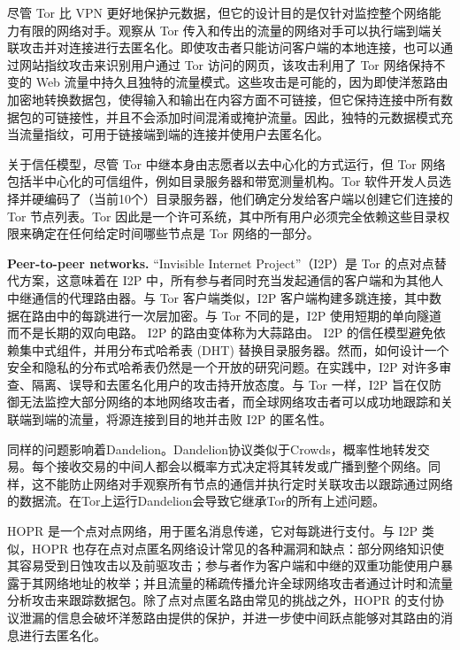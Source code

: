 \documentclass{article}
\begin{document}
	尽管 Tor 比 VPN 更好地保护元数据，但它的设计目的是仅针对监控整个网络能力有限的网络对手。观察从 Tor 传入和传出的流量的网络对手可以执行端到端关联攻击并对连接进行去匿名化\cite{ref62, ref71, ref83, ref96, ref97}。即使攻击者只能访问客户端的本地连接，也可以通过网站指纹攻击来识别用户通过 Tor 访问的网页，该攻击利用了 Tor 网络保持不变的 Web 流量中持久且独特的流量模式\cite{ref63, ref84}。这些攻击是可能的，因为即使洋葱路由加密地转换数据包，使得输入和输出在内容方面不可链接，但它保持连接中所有数据包的可链接性，并且不会添加时间混淆或掩护流量。因此，独特的元数据模式充当流量指纹，可用于链接端到端的连接并使用户去匿名化。\newline

	关于信任模型，尽管 Tor 中继本身由志愿者以去中心化的方式运行，但 Tor 网络包括半中心化的可信组件，例如目录服务器和带宽测量机构。Tor 软件开发人员选择并硬编码了（当前10个）目录服务器，他们确定分发给客户端以创建它们连接的 Tor 节点列表。Tor 因此是一个许可系统，其中所有用户必须完全依赖这些目录权限来确定在任何给定时间哪些节点是 Tor 网络的一部分。\newline

	\textbf{Peer-to-peer networks.} “Invisible Internet Project”（I2P）是 Tor 的点对点替代方案，这意味着在 I2P 中，所有参与者同时充当发起通信的客户端和为其他人中继通信的代理路由器\cite{ref58}。与 Tor 客户端类似，I2P 客户端构建多跳连接，其中数据在路由中的每跳进行一次层加密。与 Tor 不同的是，I2P 使用短期的单向隧道而不是长期的双向电路。 I2P 的路由变体称为大蒜路由。 I2P 的信任模型避免依赖集中式组件，并用分布式哈希表 (DHT) 替换目录服务器。然而，如何设计一个安全和隐私的分布式哈希表仍然是一个开放的研究问题\cite{ref102}。在实践中，I2P 对许多审查、隔离、误导和去匿名化用户的攻击持开放态度\cite{ref45, ref54, ref55, ref61}。与 Tor 一样，I2P 旨在仅防御无法监控大部分网络的本地网络攻击者，而全球网络攻击者可以成功地跟踪和关联端到端的流量，将源连接到目的地并击败 I2P 的匿名性。\newline

	同样的问题影响着Dandelion\cite{ref8}。Dandelion协议类似于Crowds\cite{ref90}，概率性地转发交易。每个接收交易的中间人都会以概率方式决定将其转发或广播到整个网络。同样，这不能防止网络对手观察所有节点的通信并执行定时关联攻击以跟踪通过网络的数据流。在Tor上运行Dandelion会导致它继承Tor的所有上述问题\cite{ref46}。\newline

	HOPR 是一个点对点网络，用于匿名消息传递，它对每跳进行支付\cite{ref56}。与 I2P 类似，HOPR 也存在点对点匿名网络设计常见的各种漏洞和缺点：部分网络知识使其容易受到日蚀攻击\cite{ref99, ref100}以及前驱攻击\cite{ref104}；参与者作为客户端和中继的双重功能使用户暴露于其网络地址的枚举；并且流量的稀疏传播允许全球网络攻击者通过计时和流量分析攻击来跟踪数据包。除了点对点匿名路由常见的挑战之外，HOPR 的支付协议泄漏的信息会破坏洋葱路由提供的保护，并进一步使中间跃点能够对其路由的消息进行去匿名化\cite{ref91}。\newline
\end{document}
